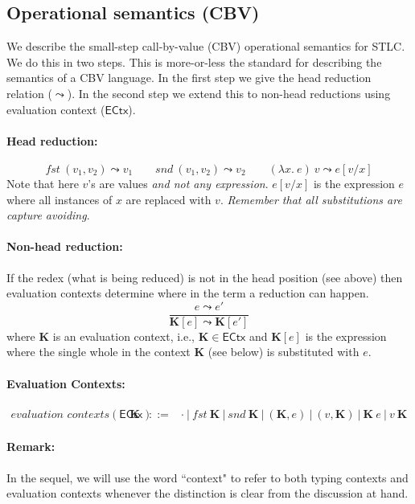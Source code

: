 \documentclass{article}
\newcommand{\gor}{~|~}
\newcommand{\fst}{\mathit{fst}}
\newcommand{\snd}{\mathit{snd}}
\newcommand{\ECTX}{\mathsf{ECtx}}
\newcommand{\ectx}{\mathbf{K}}
\begin{document}
\subsection{Operational semantics (CBV)}
We describe the small-step call-by-value (CBV) operational semantics for STLC. We do this in two steps. This is more-or-less the standard for describing the semantics of a CBV language.
In the first step we give the head reduction relation ($\leadsto$).
In the second step we extend this to non-head reductions using
evaluation context ($\ECTX$).

\paragraph{Head reduction:}
\[
\fst~(v_1, v_2) \leadsto v_1 \hspace{2em}
\snd~(v_1, v_2) \leadsto v_2 \hspace{2em}
(\lambda x.~e)~v \leadsto e[v/x]
\]
Note that here $v$'s are values \emph{and not any expression}.
$e[v/x]$ is the expression $e$ where all instances of $x$ are
replaced with $v$. \emph{Remember that all substitutions are capture avoiding}.
\paragraph{Non-head reduction:} If the redex (what is being reduced) is not in the head position (see above) then evaluation contexts determine where in the term a reduction can happen.
\[
\frac{e \leadsto e'}{\ectx[e] \leadsto \ectx[e']}
\]
where $\ectx$ is an evaluation context, i.e., $\ectx \in \ECTX$
and $\ectx[e]$ is the expression where the single whole in the context $\ectx$ (see below) is substituted with $e$.

\paragraph{Evaluation Contexts:}
\[
\begin{array}{llll}
\textit{evaluation contexts}(\ECTX) &\ectx &::=& \cdot
\gor \fst~\ectx \gor \snd~\ectx \gor (\ectx, e) \gor (v, \ectx)
\gor \ectx~e \gor v~\ectx
\end{array}
\]

\paragraph{Remark:} In the sequel, we will use the word ``context"
to refer to both typing contexts and evaluation contexts whenever
the distinction is clear from the discussion at hand.
\end{document}

